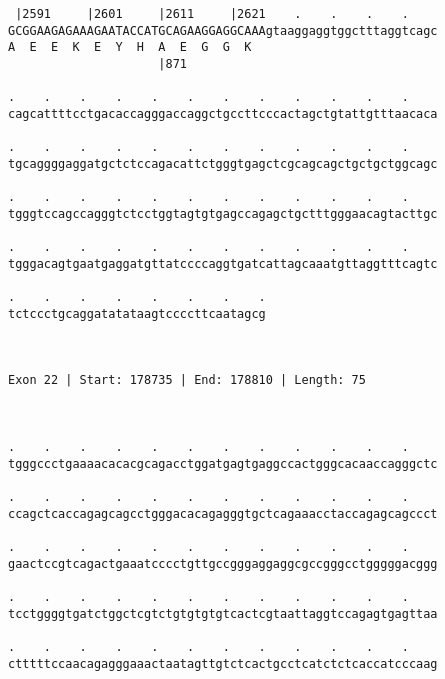 \documentclass{article}
\begin{document}
\begin{Verbatim}
 |2591     |2601     |2611     |2621    .    .    .    .    
GCGGAAGAGAAAGAATACCATGCAGAAGGAGGCAAAgtaaggaggtggctttaggtcagc
A  E  E  K  E  Y  H  A  E  G  G  K                          
                     |871                                   
  
.    .    .    .    .    .    .    .    .    .    .    .    
cagcattttcctgacaccagggaccaggctgccttcccactagctgtattgtttaacaca
                                                            
.    .    .    .    .    .    .    .    .    .    .    .    
tgcaggggaggatgctctccagacattctgggtgagctcgcagcagctgctgctggcagc
                                                            
.    .    .    .    .    .    .    .    .    .    .    .    
tgggtccagccagggtctcctggtagtgtgagccagagctgctttgggaacagtacttgc
                                                            
.    .    .    .    .    .    .    .    .    .    .    .    
tgggacagtgaatgaggatgttatccccaggtgatcattagcaaatgttaggtttcagtc
                                                            
.    .    .    .    .    .    .    .
tctccctgcaggatatataagtccccttcaatagcg
                                    
                                    
 
Exon 22 | Start: 178735 | End: 178810 | Length: 75



.    .    .    .    .    .    .    .    .    .    .    .    
tgggccctgaaaacacacgcagacctggatgagtgaggccactgggcacaaccagggctc
                                                            
.    .    .    .    .    .    .    .    .    .    .    .    
ccagctcaccagagcagcctgggacacagagggtgctcagaaacctaccagagcagccct
                                                            
.    .    .    .    .    .    .    .    .    .    .    .    
gaactccgtcagactgaaatcccctgttgccgggaggaggcgccgggcctgggggacggg
                                                            
.    .    .    .    .    .    .    .    .    .    .    .    
tcctggggtgatctggctcgtctgtgtgtgtcactcgtaattaggtccagagtgagttaa
                                                            
.    .    .    .    .    .    .    .    .    .    .    .    
ctttttccaacagagggaaactaatagttgtctcactgcctcatctctcaccatcccaag
                                                            

\end{Verbatim}
\end{document}
